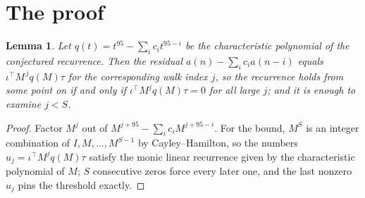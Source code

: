 \documentclass[11pt,a4paper]{article}
\theoremstyle{plain}
\newtheorem{lemma}[theorem]{Lemma}
\theoremstyle{definition}
\begin{document}
\section{The proof}

\begin{lemma}\label{lem:crit}
Let $q(t)=t^{95}-\sum_i c_it^{95-i}$ be the characteristic polynomial of the
conjectured recurrence. Then the residual $a(n)-\sum_ic_ia(n-i)$ equals
$\iota^{\!\top}M^{\,j}q(M)\tau$ for the corresponding walk index $j$, so the
recurrence holds from some point on if and only if $\iota^{\!\top}M^{j}q(M)\tau=0$ for all
large $j$; and it is enough to examine $j<S$.
\end{lemma}

\begin{proof}
Factor $M^{j}$ out of $M^{j+95}-\sum_ic_iM^{j+95-i}$. For the bound, $M^{S}$
is an integer combination of $I,M,\dots,M^{S-1}$ by Cayley--Hamilton, so the numbers
$u_j=\iota^{\!\top}M^{j}q(M)\tau$ satisfy the monic linear recurrence given by the
characteristic polynomial of $M$; $S$ consecutive zeros force every later one, and the last
nonzero $u_j$ pins the threshold exactly.
\end{proof}
\end{document}
